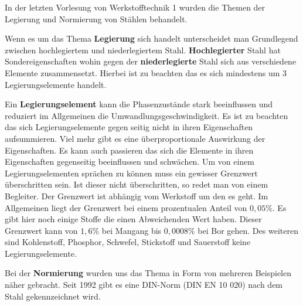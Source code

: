 \documentclass[12pt]{scrreprt}
\begin{document}
In der letzten Vorlesung von Werkstofftechnik 1 wurden die Themen der Legierung und Normierung von Stählen behandelt.\par\medskip 

Wenn es um das Thema \textbf{Legierung} sich handelt unterscheidet man Grundlegend zwischen hochlegiertem und niederlegiertem Stahl.
\textbf{Hochlegierter} Stahl hat Sondereigenschaften wohin gegen der \textbf{niederlegierte} Stahl sich aus verschiedene Elemente zusammensetzt. Hierbei ist zu beachten das es sich mindestens um 3 Legierungselemente handelt.\par\smallskip

Ein \textbf{Legierungselement} kann die Phasenzustände stark beeinflussen und reduziert im Allgemeinen die Umwandlungsgeschwindigkeit. 
Es ist zu beachten das sich Legierungselemente gegen seitig nicht in ihren Eigenschaften aufsummieren. Viel mehr gibt es eine überproportionale Auswirkung der Eigenschaften. Es kann auch passieren das sich die Elemente in ihren Eigenschaften gegenseitig beeinflussen und schwächen. 
Um von einem Legierungselementen sprächen zu können muss ein gewisser Grenzwert überschritten sein. Ist dieser nicht überschritten, so redet man von einem Begleiter. 
Der Grenzwert ist abhängig vom Werkstoff um den es geht. Im Allgemeinen liegt der Grenzwert bei einem prozentualen Anteil von $0,05\%$. Es gibt hier noch einige Stoffe die einen Abweichenden Wert haben. 
Dieser Grenzwert kann von $1,6\%$ bei Mangang bis $0,0008\%$ bei Bor gehen. Des weiteren sind  Kohlenstoff, Phosphor, Schwefel, Stickstoff und Sauerstoff keine Legierungselemente.

Bei der \textbf{Normierung} wurden uns das Thema in Form von mehreren Beispielen näher gebracht. Seit 1992 gibt es eine DIN-Norm (DIN EN 10 020) nach dem Stahl gekennzeichnet wird. 
\end{document}
